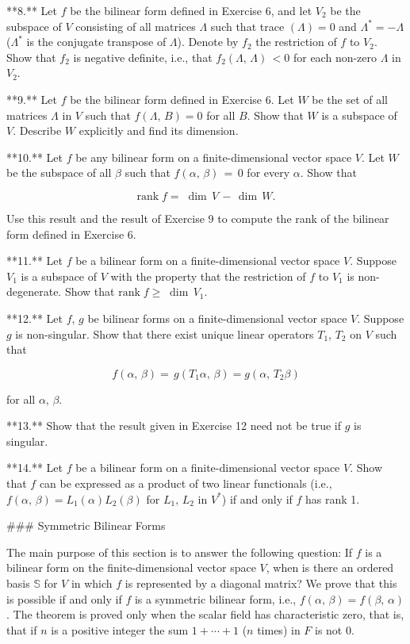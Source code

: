 

**8.** Let \(f\) be the bilinear form defined in Exercise 6, and let \(V_{2}\) be the subspace of \(V\) consisting of all matrices \(\Lambda\) such that trace \((\Lambda)=0\) and \(\Lambda^{*}=-\Lambda\) (\(\Lambda^{*}\) is the conjugate transpose of \(\Lambda\)). Denote by \(f_{2}\) the restriction of \(f\) to \(V_{2}\). Show that \(f_{2}\) is negative definite, i.e., that \(f_{2}(\Lambda,\,\Lambda)\,<0\) for each non-zero \(\Lambda\) in \(V_{2}\).

**9.** Let \(f\) be the bilinear form defined in Exercise 6. Let \(W\) be the set of all matrices \(\Lambda\) in \(V\) such that \(f(\Lambda,\,B)=0\) for all \(B\). Show that \(W\) is a subspace of \(V\). Describe \(W\) explicitly and find its dimension.

**10.** Let \(f\) be any bilinear form on a finite-dimensional vector space \(V\). Let \(W\) be the subspace of all \(\beta\) such that \(f(\alpha,\,\beta)\,=\,0\) for every \(\alpha\). Show that

\[\mbox{rank}\;f=\;\dim\,V\,-\,\dim\,W.\]

Use this result and the result of Exercise 9 to compute the rank of the bilinear form defined in Exercise 6.

**11.** Let \(f\) be a bilinear form on a finite-dimensional vector space \(V\). Suppose \(V_{1}\) is a subspace of \(V\) with the property that the restriction of \(f\) to \(V_{1}\) is non-degenerate. Show that \(\mbox{rank}\;f\geq\;\dim\,V_{1}\).

**12.** Let \(f\), \(g\) be bilinear forms on a finite-dimensional vector space \(V\). Suppose \(g\) is non-singular. Show that there exist unique linear operators \(T_{1}\), \(T_{2}\) on \(V\) such that

\[f(\alpha,\,\beta)=\,g(T_{1}\alpha,\,\beta)=g(\alpha,\,T_{2}\beta)\]

for all \(\alpha\), \(\beta\).

**13.** Show that the result given in Exercise 12 need not be true if \(g\) is singular.

**14.** Let \(f\) be a bilinear form on a finite-dimensional vector space \(V\). Show that \(f\) can be expressed as a product of two linear functionals (i.e., \(f(\alpha,\,\beta)=L_{1}(\alpha)L_{2}(\beta)\) for \(L_{1},\,L_{2}\) in \(V^{*}\)) if and only if \(f\) has rank 1.

### Symmetric Bilinear Forms

The main purpose of this section is to answer the following question: If \(f\) is a bilinear form on the finite-dimensional vector space \(V\), when is there an ordered basis \(\mathbb{S}\) for \(V\) in which \(f\) is represented by a diagonal matrix? We prove that this is possible if and only if \(f\) is a symmetric bilinear form, i.e., \(f(\alpha,\,\beta)=f(\beta,\,\alpha)\). The theorem is proved only when the scalar field has characteristic zero, that is, that if \(n\) is a positive integer the sum \(1+\cdots+1\) (\(n\) times) in \(F\) is not 0.

